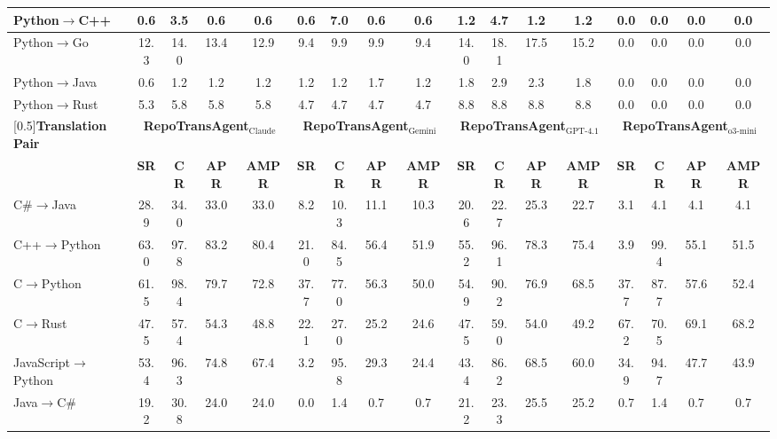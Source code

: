 \begin{table}[t]
{\begin{tabular}{|l|c|c|c|c|c|c|c|c|c|c|c|c|c|c|c|c|}
    \hline
    Python$\rightarrow$C++ & 0.6 & 3.5 & 0.6 & 0.6 & 0.6 & 7.0 & 0.6 & 0.6 & 1.2 & 4.7 & 1.2 & 1.2 & 0.0 & 0.0 & 0.0 & 0.0 \\
    \hline
    Python$\rightarrow$Go & 12.3 & 14.0 & 13.4 & 12.9 & 9.4 & 9.9 & 9.9 & 9.4 & 14.0 & 18.1 & 17.5 & 15.2 & 0.0 & 0.0 & 0.0 & 0.0 \\
    \hline
    Python$\rightarrow$Java & 0.6 & 1.2 & 1.2 & 1.2 & 1.2 & 1.2 & 1.7 & 1.2 & 1.8 & 2.9 & 2.3 & 1.8 & 0.0 & 0.0 & 0.0 & 0.0 \\
    \hline
    Python$\rightarrow$Rust & 5.3 & 5.8 & 5.8 & 5.8 & 4.7 & 4.7 & 4.7 & 4.7 & 8.8 & 8.8 & 8.8 & 8.8 & 0.0 & 0.0 & 0.0 & 0.0 \\
    \hline
    \hline
    \rowcolor[gray]{0.95}
    \multirow{2}{*}[0.5\tabcolsep]{\textbf{Translation Pair}} & \multicolumn{4}{c|}{\textbf{RepoTransAgent$_{\text{Claude}}$}} & \multicolumn{4}{c|}{\textbf{RepoTransAgent$_{\text{Gemini}}$}} & \multicolumn{4}{c|}{\textbf{RepoTransAgent$_{\text{GPT-4.1}}$}} & \multicolumn{4}{c|}{\textbf{RepoTransAgent$_{\text{o3-mini}}$}} \\
    \cline{2-17}
    \rowcolor[gray]{0.95}
    & \textbf{SR} & \textbf{CR} & \textbf{APR} & \textbf{AMPR} & \textbf{SR} & \textbf{CR} & \textbf{APR} & \textbf{AMPR} & \textbf{SR} & \textbf{CR} & \textbf{APR} & \textbf{AMPR} & \textbf{SR} & \textbf{CR} & \textbf{APR} & \textbf{AMPR} \\
    \hline
    \hline
    C\#$\rightarrow$Java & 28.9 & 34.0 & 33.0 & 33.0 & 8.2 & 10.3 & 11.1 & 10.3 & 20.6 & 22.7 & 25.3 & 22.7 & 3.1 & 4.1 & 4.1 & 4.1 \\
    \hline
    C++$\rightarrow$Python & 63.0 & 97.8 & 83.2 & 80.4 & 21.0 & 84.5 & 56.4 & 51.9 & 55.2 & 96.1 & 78.3 & 75.4 & 3.9 & 99.4 & 55.1 & 51.5 \\
    \hline
    C$\rightarrow$Python & 61.5 & 98.4 & 79.7 & 72.8 & 37.7 & 77.0 & 56.3 & 50.0 & 54.9 & 90.2 & 76.9 & 68.5 & 37.7 & 87.7 & 57.6 & 52.4 \\
    \hline
    C$\rightarrow$Rust & 47.5 & 57.4 & 54.3 & 48.8 & 22.1 & 27.0 & 25.2 & 24.6 & 47.5 & 59.0 & 54.0 & 49.2 & 67.2 & 70.5 & 69.1 & 68.2 \\
    \hline
    JavaScript$\rightarrow$Python & 53.4 & 96.3 & 74.8 & 67.4 & 3.2 & 95.8 & 29.3 & 24.4 & 43.4 & 86.2 & 68.5 & 60.0 & 34.9 & 94.7 & 47.7 & 43.9 \\
    \hline
    Java$\rightarrow$C\# & 19.2 & 30.8 & 24.0 & 24.0 & 0.0 & 1.4 & 0.7 & 0.7 & 21.2 & 23.3 & 25.5 & 25.2 & 0.7 & 1.4 & 0.7 & 0.7 \\

\end{tabular}}
\end{table}
